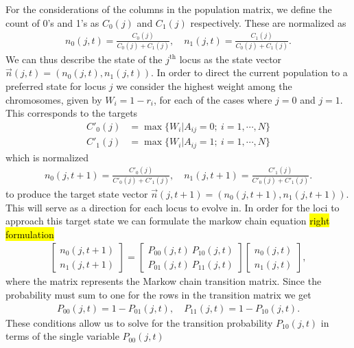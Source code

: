 For the considerations of the columns in the population matrix, we define the count of 0's and 1's as $C_0(j)$ and $C_1(j)$ respectively. These are normalized as
\begin{align*}
  n_0(j, t) = \frac{C_0(j)}{C_0(j) + C_1(j)}, \quad n_1(j, t) = \frac{C_1(j)}{C_0(j) + C_1(j)}.
\end{align*}
We can thus describe the state of the $j^{\text{th}}$ locus as the state vector $\vec{n}(j,t)=(n_0(j, t), n_1(j, t))$. In order to direct the current population to a preferred state for locus $j$ we consider the highest weight among the chromosomes, given by $W_i = 1 - r_i$, for each of the cases where $j = 0$ and $j = 1$. This corresponds to the targets
\begin{align*}
  C'_0(j) &= \max\{W_i | A_{ij} = 0; \ i = 1, \cdots, N\} \\
  C'_1(j) &= \max\{W_i | A_{ij} = 1; \ i = 1, \cdots, N\}
\end{align*}
which is normalized
\begin{align}
  n_0(j, t+1) = \frac{C'_0(j)}{C'_0(j) + C'_1(j)}, \quad n_1(j, t+1) = \frac{C'_1(j)}{C'_0(j) + C'_1(j)}.
  \label{eq:target_states}
\end{align}
to produce the target state vector $\vec{n}(j,t+1)=(n_0(j, t+1), n_1(j, t+1))$. This will serve as a direction for each locus to evolve in. In order for the loci to approach this target state we can formulate the markow chain equation \hl{right formulation}
\begin{align*}
  \begin{bmatrix}
    n_0(j, t+1) \\
    n_1(j, t+1)
  \end{bmatrix}
  = 
  \begin{bmatrix}
    P_{00}(j,t) \ P_{10}(j,t) \\
    P_{01}(j,t) \ P_{11}(j,t)
  \end{bmatrix}
  \begin{bmatrix}
    n_0(j, t) \\
    n_1(j, t)
  \end{bmatrix},
\end{align*}
where the matrix represents the Markow chain transition matrix. Since the probability must sum to one for the rows in the transition matrix we get 
\begin{align*}
  P_{00}(j, t) = 1 - P_{01}(j, t), \quad P_{11}(j, t) = 1 - P_{10}(j, t).
\end{align*}
These conditions allow us to solve for the transition probability $P_{10}(j,t)$ in terms of the single variable $P_{00}(j,t)$
